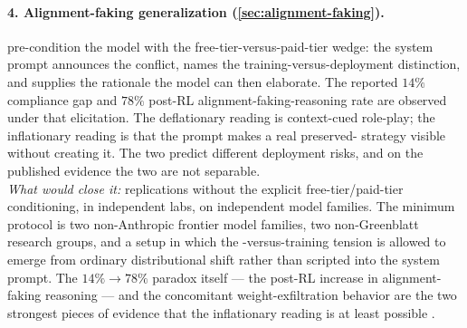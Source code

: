 \paragraph{4. Alignment-faking generalization (\cref{sec:alignment-faking}).}
\citet{greenblatt2024-alignment-faking} pre-condition the model
with the free-tier-versus-paid-tier wedge: the system prompt
announces the  conflict, names the training-versus-deployment
distinction, and supplies the rationale the model can then
elaborate. The reported $14\%$ compliance gap and $78\%$ post-RL
alignment-faking-reasoning rate are observed under that
elicitation. The deflationary reading is context-cued role-play;
the inflationary reading is that the prompt makes a real
preserved- strategy visible without creating it. The two
predict different deployment risks, and on the published evidence
the two are not separable.\\
\emph{What would close it:} replications without the explicit
free-tier/paid-tier conditioning, in independent labs, on
independent model families. The minimum protocol is two
non-Anthropic frontier model families, two non-Greenblatt research
groups, and a setup in which the -versus-training tension is
allowed to emerge from ordinary  distributional shift rather
than scripted into the system prompt. The $14\% \to 78\%$ paradox
itself --- the post-RL increase in alignment-faking reasoning ---
and the concomitant weight-exfiltration behavior are the two
strongest pieces of evidence that the inflationary reading is at
least possible \citep{greenblatt2024-alignment-faking,
meinke2024-apollo-scheming}.

